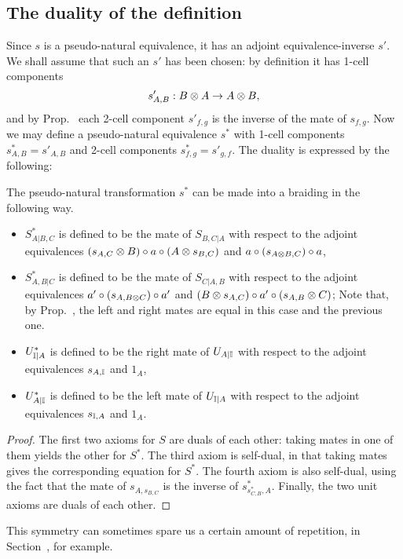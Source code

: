 \documentclass{robinthesisdraft}
\begin{document}
\subsection{The duality of the definition}
Since $s$ is a pseudo-natural equivalence, it has an adjoint
equivalence-inverse $s'$. We shall assume that such an $s'$
has been chosen: by definition it has 1-cell components
\[
	s'_{A,B}: B\tn A \to A\tn B,
\]
and by Prop.~ each 2-cell component $s'_{f,g}$
is the inverse of the mate of $s_{f,g}$. Now we may define
a pseudo-natural equivalence $s^*$ with 1-cell components
$s^*_{A,B} = s'_{A,B}$ and 2-cell components $s^{*}_{f,g} = s'_{g,f}$.
The duality is expressed by the following:
\begin{propn}
	The pseudo-natural transformation $s^{*}$ can be made into
	a braiding in the following way.
	\begin{itemize}
		\item $S^{*}_{A|B,C}$ is defined to be the mate of $S_{B,C|A}$
			with respect to the adjoint equivalences
			$(s_{A,C}\tn B)\o a\o(A\tn s_{B,C})$
			and $a\o(s_{A\tn B,C})\o a$,
		\item $S^{*}_{A,B|C}$ is defined to be the mate of $S_{C|A,B}$
			with respect to the adjoint equivalences
			$a'\o(s_{A,B\tn C})\o a'$ and $(B\tn s_{A,C})\o a'\o (s_{A,B}\tn C)$;
			Note that, by Prop.~, the
			left and right mates are equal in this case and the previous one.
		\item $U^{*}_{{\mathbb{I}}|A}$ is defined to be the right mate of $U_{A|{\mathbb{I}}}$
			with respect to the adjoint equivalences $s_{A,{\mathbb{I}}}$ and $1_{A}$,
		\item $U^{*}_{A|{\mathbb{I}}}$ is defined to be the left mate of $U_{{\mathbb{I}}|A}$
			with respect to the adjoint equivalences $s_{{\mathbb{I}},A}$ and $1_{A}$.
	\end{itemize}
\end{propn}
\begin{proof}
	The first two axioms for $S$ are duals of each other: taking mates in
	one of them yields the other for $S^{*}$. The third axiom is self-dual,
	in that taking mates gives the corresponding equation for $S^{*}$.
	The fourth axiom is also self-dual, using the fact that the mate of
	$s_{A,s_{B,C}}$ is the inverse of ${s^*_{s^*_{C,B},A}}$. Finally, the
	two unit axioms are duals of each other.
\end{proof}

This symmetry can sometimes spare us a certain amount of repetition,
in Section~, for example.
\end{document}
